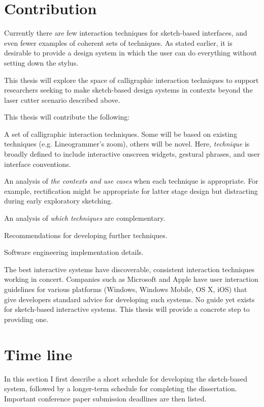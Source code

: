 \documentclass[12pt]{article}
\newenvironment{packed_enum}{
\begin{enumerate}
  \setlength{\itemsep}{1pt}
  \setlength{\parskip}{0pt}
  \setlength{\parsep}{0pt}
}{\end{enumerate}}
\begin{document}
\section{Contribution}

Currently there are few interaction techniques for sketch-based
interfaces, and even fewer examples of coherent sets of techniques. As
stated earlier, it is desirable to provide a design system in which
the user can do everything without setting down the stylus.

This thesis will explore the space of calligraphic interaction
techniques to support researchers seeking to make sketch-based design
systems in contexts beyond the laser cutter scenario described above.

This thesis will contribute the following:
\begin{packed_enum}
\item A set of calligraphic interaction techniques. Some will be based
  on existing techniques (e.g. Lineogrammer's zoom), others will be
  novel. Here, \textit{technique} is broadly defined to include
  interactive onscreen widgets, gestural phrases, and user interface
  conventions.
\item An analysis of \textit{the contexts and use cases} when each
  technique is appropriate. For example, rectification might be
  appropriate for latter stage design but distracting during early
  exploratory sketching.
\item An analysis of \textit{which techniques} are complementary.
\item Recommendations for developing further techniques.
\item Software engineering implementation details.
\end{packed_enum}

The best interactive systems have discoverable, consistent interaction
techniques working in concert. Companies such as Microsoft and Apple
have user interaction guidelines for various platforms (Windows,
Windows Mobile, OS X, iOS) that give developers standard advice for
developing such systems. No guide yet exists for sketch-based
interactive systems. This thesis will provide a concrete step to
providing one.

\section{Time line}

In this section I first describe a short schedule for developing the
sketch-based system, followed by a longer-term schedule for completing
the dissertation. Important conference paper submission deadlines are
then listed.
\end{document}
